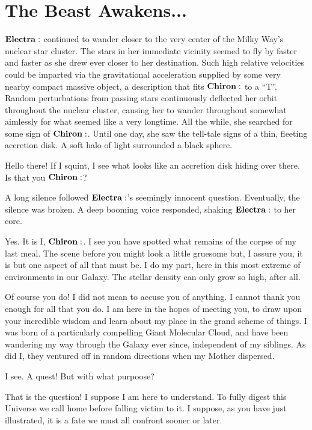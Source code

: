 \documentclass[main.tex]{subfiles}
\begin{document}
\section{The Beast Awakens...}

$\Electra$ continued to wander closer to the very center of the Milky Way's nuclear star cluster.  The stars in her immediate vicinity seemed to fly by faster and faster as she drew ever closer to her destination.  Such high relative velocities could  be imparted via the gravitational acceleration supplied by some very nearby compact massive object, a description that fits $\Chiron$ to a ``T''.  Random perturbations from passing stars continuously deflected her orbit throughout the nuclear cluster, causing her to wander throughout somewhat aimlessly for what seemed like a very longtime.  All the while, she searched for some sign of $\Chiron$.  Until one day, she saw the tell-tale signs of a thin, fleeting accretion disk.  A soft halo of light surrounded a black sphere.

\Electra  Hello there!  If I squint, I see what looks like an accretion disk hiding over there.  Is that you $\Chiron$?

A long silence followed $\Electra$'s seemingly innocent question.  Eventually, the silence was broken. A deep booming voice responded, shaking $\Electra$ to her core.

\Chiron Yes.  It is I, $\Chiron$.  I see you have spotted what remains of the corpse of my last meal.  The scene before you might look a little gruesome but, I assure you, it is but one aspect of all that must be.  I do my part, here in this most extreme of environments in our Galaxy.  The stellar density can only grow so high, after all.

\Electra Of course you do!  I did not mean to accuse you of anything.  I cannot thank you enough for all that you do.  I am here in the hopes of meeting you, to draw upon your incredible wisdom and learn about my place in the grand scheme of things.  I was born of a particularly compelling Giant Molecular Cloud, and have been wandering my way through the Galaxy ever since, independent of my siblings.  As did I, they ventured off in random directions when my Mother dispersed.

\Chiron I see.  A quest!  But with what purpoose?

\Electra That is the question!  I suppose I am here to understand.  To fully digest this Universe we call home before falling victim to it.  I suppose, as you have just illustrated, it is a fate we must all confront sooner or later.
\end{document}
